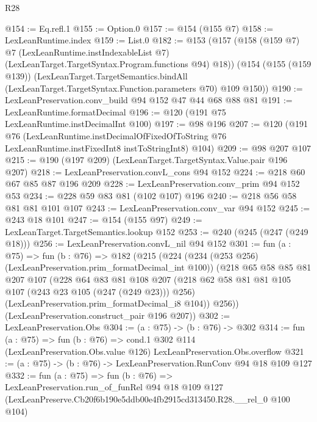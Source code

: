 \begin{lexlean}{R28}
\begin{coremodule}
@154 := Eq.refl.{1}
@155 := Option.{0}
@157 := @154 (@155 @7)
@158 := LexLeanRuntime.index
@159 := List.{0}
@182 := @153
    (@157
      (@158
        (@159 @7)
        @7
        (LexLeanRuntime.instIndexableList @7)
        (LexLeanTarget.TargetSyntax.Program.functions @94)
        @18))
    (@154
      (@155 (@159 @139))
      (LexLeanTarget.TargetSemantics.bindAll
        (LexLeanTarget.TargetSyntax.Function.parameters @70)
        @109
        @150))
@190 := LexLeanPreservation.conv_build @94 @152 @47 @44 @68 @88 @81
@191 := LexLeanRuntime.formatDecimal
@196 := @120 (@191 @75 LexLeanRuntime.instDecimalInt @100)
@197 := @98 @196
@207 := @120
    (@191
      @76
      (LexLeanRuntime.instDecimalOfFixedOfToString
        @76
        LexLeanRuntime.instFixedInt8
        instToStringInt8)
      @104)
@209 := @98 @207 @107
@215 := @190 (@197 @209) (LexLeanTarget.TargetSyntax.Value.pair @196 @207)
@218 := LexLeanPreservation.convL_cons @94 @152
@224 := @218 @60 @67 @85 @87 @196 @209
@228 := LexLeanPreservation.conv_prim @94 @152 @53
@234 := @228 @59 @83 @81 (@102 @107) @196
@240 := @218 @56 @58 @81 @81 @101 @107
@243 := LexLeanPreservation.conv_var @94 @152
@245 := @243 @18 @101
@247 := @154 (@155 @97)
@249 := LexLeanTarget.TargetSemantics.lookup @152
@253 := @240 (@245 (@247 (@249 @18)))
@256 := LexLeanPreservation.convL_nil @94 @152
@301 := fun (a : @75) =>
  fun (b : @76) =>
  @182
    (@215
      (@224
        (@234 (@253 @256) (LexLeanPreservation.prim_formatDecimal_int @100))
        (@218
          @65
          @58
          @85
          @81
          @207
          @107
          (@228
            @64
            @83
            @81
            @108
            @207
            (@218 @62 @58 @81 @81 @105 @107 (@243 @23 @105 (@247 (@249 @23))) @256)
            (LexLeanPreservation.prim_formatDecimal_i8 @104))
          @256))
      (LexLeanPreservation.construct_pair @196 @207))
@302 := LexLeanPreservation.Obs
@304 := (a : @75) -> (b : @76) -> @302
@314 := fun (a : @75) =>
  fun (b : @76) =>
  cond.{1} @302 @114 (LexLeanPreservation.Obs.value @126) LexLeanPreservation.Obs.overflow
@321 := (a : @75) -> (b : @76) -> LexLeanPreservation.RunConv @94 @18 @109 @127
@332 := fun (a : @75) =>
  fun (b : @76) =>
  LexLeanPreservation.run_of_funRel
    @94
    @18
    @109
    @127
    (LexLeanPreserve.Cb20f6b190e5ddb00e4fb2915cd313450.R28.__rel_0 @100 @104)
\end{coremodule}
\end{lexlean}
